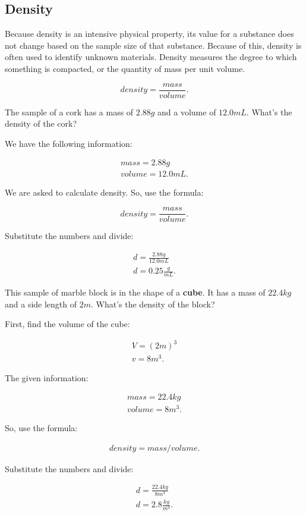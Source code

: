 
\subsection*{Density}
\label{sub_sec:density}

Because density is an intensive physical property, its value for a substance
does not change based on the sample size of that substance. Because of this,
density is often used to identify unknown materials. Density measures the
degree to which something is compacted, or the quantity of mass per unit
volume.

\[
  density = \frac{mass}{volume}
.\] 

\begin{example}
  The sample of a cork has a mass of $2.88 g$ and a volume of $12.0 mL$. What's the density of the cork?

  We have the following information:

  \begin{align*}
    mass = 2.88 g \\
    volume = 12.0 mL
  .\end{align*}

  We are asked to calculate density. So, use the formula:

  \[
    density = \frac{mass}{volume}
  .\]

  Substitute the numbers and divide:

  \begin{align*}
    d = \frac{2.88 g}{12.0 mL} \\
    d = 0.25 \frac{g}{mL}
  .\end{align*}
\end{example}

\begin{example}
  This sample of marble block is in the shape of a \textbf{cube}. It has a mass
  of $22.4 kg$ and a side length of $2 m$. What's the density of the block?

  First, find the volume of the cube:

  \begin{align*}
    V = (2 m)^3 \\
    v = 8 m^3
  .\end{align*}

  The given information:

  \begin{align*}
    mass = 22.4 kg \\
    volume = 8 m^3
  .\end{align*}

  So, use the formula:

  \begin{align*}
    density = mass/volume
  .\end{align*}

  Substitute the numbers and divide:

  \begin{align*}
    d = \frac{22.4 kg}{8 m^3} \\
    d = 2.8 \frac{kg}{m^3}
  .\end{align*}
\end{example}

